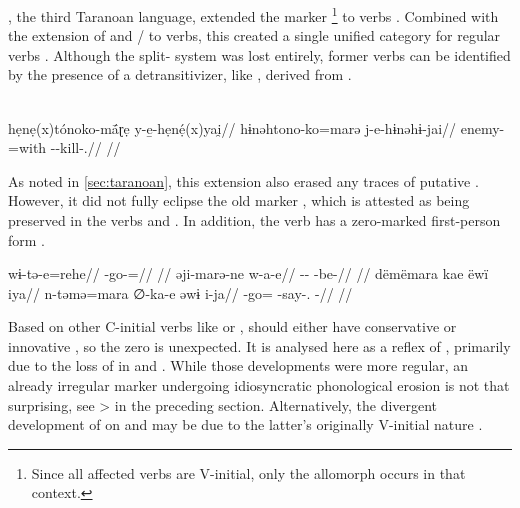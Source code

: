 \subsubsection{\carijo {}}
\label{sec:carijo}
\carijo, the third Taranoan language, extended the  marker \footnote{Since all affected  verbs are V-initial, only the  allomorph  occurs in that context.} to  verbs \parencite[105--107]{meira1998proto}.
Combined with the extension of   and  / to  verbs, this created a single unified  category for regular verbs .
%
%
%
Although the split- system was lost entirely, former  verbs can be identified by the presence of a detransitivizer, like   , derived from   \parencite[179]{robayo2000avance}.

\carijo \parencite[][79]{koch1908hiana}\\
\begingl
\glpreamble hẹnẹ(x)tónoko-mā́ɽẹ y-e̱-hẹnẹ́(x)yai̯//
\gla hɨnəhtono-ko=marə j-e-hɨnəhɨ-jai//
\glb enemy-=with --kill-.//
\glft {}//
\endgl
\xe
%


As noted in \cref{sec:taranoan}, this extension also erased any traces of putative \PTar {} .
However, it did not fully eclipse the old  marker , which is attested as being preserved in the verbs    and   .
In addition, the verb   has a zero-marked first-person form .

\carijo \parencite[][5, 42, personal communication]{guerrero2016karihona}
\begingl
\gla wɨ-tə-e=rehe//
\glb {}-go-=//
\glft {}//
\endgl
{}
\begingl
\gla əji-marə-ne w-a-e//
\glb {}-- -be-//
\glft {}//
\endgl
{}
\begingl
\glpreamble dëmëmara kae ëwï iya//
\gla n-təmə=mara ∅-ka-e əwɨ i-ja//
\glb {}-go= -say-.  -//
\glft {}//
\endgl
\xe

Based on other C-initial verbs like   or  ,   should either have conservative  or innovative , so the zero is unexpected.
It is analysed here as a reflex of , primarily due to the loss of  in \ikpeng and \hixka.
While those developments were more regular, an already irregular marker undergoing idiosyncratic phonological erosion is not that surprising, see \akuriyo {} >  in the preceding section.
Alternatively, the divergent development of  on   and   may be due to the latter's originally V-initial nature .

